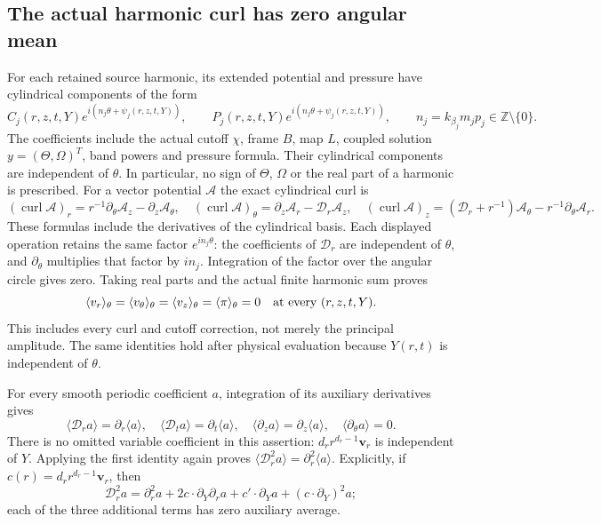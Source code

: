 \documentclass[11pt]{article}
\begin{document}
\subsection{The actual harmonic curl has zero angular mean}
\label{nsmom:zero_mean}
For each retained source harmonic, its extended potential and pressure
have cylindrical components of the form
\[
 C_j(r,z,t,Y)e^{i(n_j\theta+\psi_j(r,z,t,Y))},\qquad
 P_j(r,z,t,Y)e^{i(n_j\theta+\psi_j(r,z,t,Y))},\qquad
 n_j=k_{\beta_j}m_jp_j\in\mathbb Z\setminus\{0\}.
\]
The coefficients include the actual cutoff $\chi$, frame $B$, map $L$,
coupled solution $y=(\Theta,\Omega)^T$, band powers and pressure formula.
Their cylindrical components are independent of $\theta$. In particular,
no sign of $\Theta$, $\Omega$ or the real part of a harmonic is prescribed.
For a vector potential $\mathcal A$ the exact cylindrical curl is
\[
 (\operatorname{curl}\mathcal A)_r=r^{-1}\partial_\theta\mathcal A_z
                         -\partial_z\mathcal A_\theta,
 \quad
 (\operatorname{curl}\mathcal A)_\theta=\partial_z\mathcal A_r
                         -\mathscr D_r\mathcal A_z,
 \quad
 (\operatorname{curl}\mathcal A)_z=(\mathscr D_r+r^{-1})\mathcal A_\theta
                         -r^{-1}\partial_\theta\mathcal A_r.
\]
These formulas include the derivatives of the cylindrical basis.
Each displayed operation retains the same factor $e^{in_j\theta}$:
the coefficients of $\mathscr D_r$ are independent of $\theta$, and
$\partial_\theta$ multiplies that factor by $in_j$. Integration of the
factor over the angular circle gives zero. Taking real parts and the
actual finite harmonic sum proves
\begin{equation}
 \langle v_r\rangle_\theta=\langle v_\theta\rangle_\theta
 =\langle v_z\rangle_\theta=\langle\pi\rangle_\theta=0
 \quad\hbox{at every }(r,z,t,Y).
 \label{nsmom:mean_zero}
\end{equation}
This includes every curl and cutoff correction, not merely the
principal amplitude. The same identities hold after physical
evaluation because $Y(r,t)$ is independent of $\theta$.

For every smooth periodic coefficient $a$, integration of its auxiliary
derivatives gives
\begin{equation}
 \langle\mathscr D_r a\rangle=\partial_r\langle a\rangle,
 \quad\langle\mathscr D_t a\rangle=\partial_t\langle a\rangle,
 \quad\langle\partial_z a\rangle=\partial_z\langle a\rangle,
 \quad\langle\partial_\theta a\rangle=0.
 \label{nsmom:commute}
\end{equation}
There is no omitted variable coefficient in this assertion:
$d_r r^{d_r-1}\mathbf v_r$ is independent of $Y$. Applying the first
identity again proves
$\langle\mathscr D_r^2a\rangle=\partial_r^2\langle a\rangle$.
Explicitly, if $c(r)=d_r r^{d_r-1}\mathbf v_r$, then
\[
 \mathscr D_r^2 a=\partial_r^2a+2c\cdot\partial_Y\partial_r a
 +c'\cdot\partial_Ya+(c\cdot\partial_Y)^2a;
\]
each of the three additional terms has zero auxiliary average.
\end{document}
